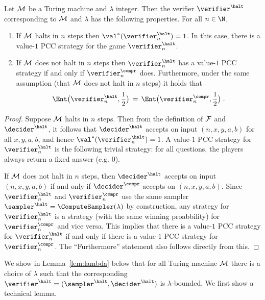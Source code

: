\begin{lemma}\label{lem:dhalt-values}
  Let $\cal{M}$ be a Turing machine and $\lambda$ integer.
  Then the verifier $\verifier^\halt$ corresponding to $\cal{M}$ and $\lambda$ has the following properties. For all $n \in \N$,
  \begin{enumerate}
  \item If $\cal{M}$ halts in $n$ steps then
    $\val^*(\verifier^\halt_n)=1$.
   In this case, there is a value-$1$ PCC strategy for the game
    $\verifier^\halt_n$.
  \item If $\cal{M}$ does not halt in $n$ steps then
    $\verifier^\halt_n$ has a value-$1$ PCC strategy if and only if
    $\verifier^\compr_n$ does.
    Furthermore, under the same assumption (that $\cal{M}$ does not halt in $n$ steps) it holds that 
    \begin{equation*}
      \Ent\big(\verifier^\halt_n, \frac{1}{2}\big) \,=\,
      \Ent\big(\verifier^\compr_n, \frac{1}{2}\big)\;.
    \end{equation*}
  \end{enumerate}
\end{lemma}
		
\begin{proof}
  Suppose $\cal{M}$ halts in $n$ steps.
  Then from the definition of $\cal{F}$ and $\decider^\halt$, it follows that
  $\decider^{\halt}$ accepts on input $(n, x, y, a, b)$ for all $x,y,a,b$, and
  hence $\val^*(\verifier^\halt_n) = 1$. A value-$1$ PCC
  strategy for $\verifier^\halt_n$ is the following trivial strategy: for all questions, the players always
  return a fixed answer (e.g. $0$). 
  
  
  If $\cal{M}$ does not halt in $n$ steps, then $\decider^{\halt}$ accepts on
  input $(n, x, y, a,b)$ if and only if $\decider^\compr$ accepts on $(n, x, y,
  a,b)$.   Since $\verifier^\halt_n$ and $\verifier^\compr_n$ use the same sampler $\sampler^\halt = \ComputeSampler(\lambda)$
  by construction, any strategy for $\verifier^\halt_n$ is a strategy (with the same winning proabbility) for $\verifier^\compr_n$ and vice versa. This implies that there is a value-$1$ PCC strategy for $\verifier^\halt_n$ if and only if
  there is a value-$1$ PCC strategy for $\verifier^\compr_n$. The ``Furthermore'' statement also follows directly from this.
\end{proof}

We show in Lemma~\ref{lem:lambda} below that for all Turing machine $\cal{M}$ there is a choice of
$\lambda$ such that the corresponding $\verifier^\halt = (\sampler^\halt, \decider^\halt)$ is
$\lambda$-bounded. We first show a technical
lemma.

